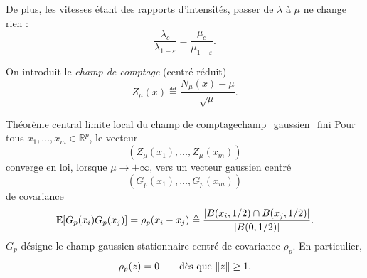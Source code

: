De plus, les vitesses étant des rapports d'intensités, passer de $\lambda$ à $\mu$ ne change rien :
\[
    \frac{\lambda_c}{\lambda_{1-\varepsilon}}
    =
    \frac{\mu_c}{\mu_{1-\varepsilon}}.
\]

On introduit le \emph{champ de comptage} (centré réduit)
\[
    Z_\mu(x)
    \eqdef
    \frac{N_\mu(x)-\mu}{\sqrt\mu}.
\]

\begin{Fait}{Théorème central limite local du champ de comptage}{champ_gaussien_fini}
Pour tous $x_1,\ldots,x_m\in\mathbb R^p$, le vecteur
\[
    \left(Z_\mu(x_1),\ldots,Z_\mu(x_m)\right)
\]
converge en loi, lorsque $\mu\to+\infty$, vers un vecteur gaussien centré
\[
    \left(G_p(x_1),\ldots,G_p(x_m)\right)
\]
de covariance
\[
    \mathbb E[G_p(x_i)G_p(x_j)]
    =
    \rho_p(x_i-x_j)
    \triangleq
    \frac{|B(x_i,1/2)\cap B(x_j,1/2)|}{\lvert B(0,1/2) \rvert}.
\]
$G_p$ désigne le champ gaussien stationnaire centré de covariance $\rho_p$. En particulier,
\[
    \rho_p(z)=0
    \qquad\text{dès que }\lVert z \rVert\ge1.
\]
\end{Fait}

